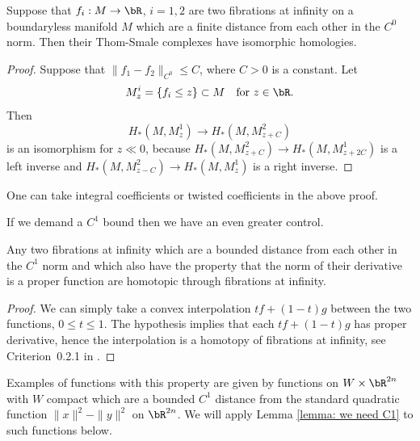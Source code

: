 \begin{lemma}\label{Lemma: bars}
Suppose that $f_i:M \to \bR$, $i=1,2$ are two fibrations at infinity on a boundaryless manifold $M$ which are a finite distance from each other in the $C^0$ norm. Then their Thom-Smale complexes have isomorphic homologies.
\end{lemma}
\begin{proof}
Suppose that $\|f_1-f_2\|_{C^0} \leq C$, where $C>0$ is a constant. Let
\[
M^i_z=\{f_i \leq z \} \subset M\quad\text{for }z \in \bR.
\]
Then
\[
H_*(M,M^1_z) \to H_*(M,M^2_{z+C})
\]
is an isomorphism for $z \ll 0$, because $H_*(M,M^2_{z+C}) \to H_*(M,M^1_{z+2C})$ is a left inverse and $H_*(M,M^2_{z-C}) \to H_*(M,M^1_z)$ is a right inverse. \end{proof}

\begin{remark} One can take integral coefficients or twisted coefficients in the above proof. \end{remark}

If we demand a $C^1$ bound then we have an even greater control.

\begin{lemma}\label{lemma: we need C1}
Any two fibrations at infinity which are a bounded distance from each other in the $C^1$ norm and which also have the property that the norm of their derivative is a proper function are homotopic through fibrations at infinity.
\end{lemma}

\begin{proof}
We can simply take a convex interpolation $tf+(1-t)g$ between the two functions, $0 \leq t \leq 1$. The hypothesis implies that each $tf+(1-t)g$ has proper derivative, hence the interpolation is a homotopy of fibrations at infinity, see Criterion~0.2.1 in \cite{EG98}.
\end{proof}

\begin{example}\label{ex: standard quadratic}
Examples of functions with this property are given by functions on $W\times \bR^{2n}$ with $W$ compact which are a bounded $C^1$ distance from the standard quadratic function $\|x\|^2-\|y\|^2$ on $\bR^{2n}$. We will apply Lemma \ref{lemma: we need C1} to such functions below.
\end{example}

